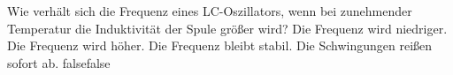     {Wie verhält sich die Frequenz eines LC-Oszillators, wenn bei zunehmender Temperatur die Induktivität der Spule größer wird?}
    {Die Frequenz wird niedriger.}
    {Die Frequenz wird höher.}
    {Die Frequenz bleibt stabil.}
    {Die Schwingungen reißen sofort ab.}
    {false}{false}